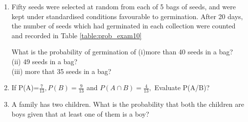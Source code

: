 \begin{enumerate}[label=\arabic*.,ref=\thesubsection.\theenumi]
%
\begin{table}[!ht]
\centering
{}
\caption{}
\end{table}
\solution


\item Fifty seeds were selected at random from each of 5 bags of seeds, and were kept under standardised conditions favourable to germination. After 20 days, the
number of seeds which had germinated in each collection were counted and recorded in Table \ref{table:prob_exam10}

What is the probability of germination of
(i)more than 40 seeds in a bag?\\
(ii) 49 seeds in a bag?\\
(iii) more that 35 seeds in a bag?\\

\begin{table}[!ht]
\centering
{}
\caption{}
\label{table:prob_exam10}
\end{table}
\solution



\item If P(A)=$\frac{7}{13}, P(B)=\frac{9}{13}$ and $P(A\cap B)=\frac{4}{13},$ Evaluate P(A/B)?\\

\item A family has two children. What is the probability that both the children are boys given that at least one of them is a boy?\\


\end{enumerate}
